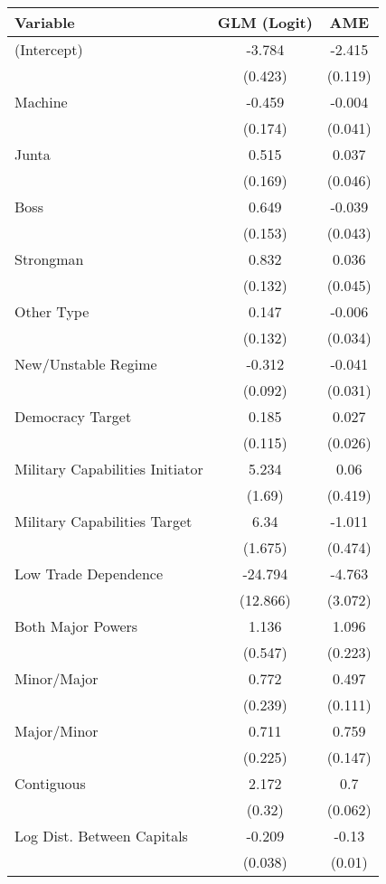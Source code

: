 \begin{table}[ht]
\centering
\begingroup\normalsize
\begin{tabular}{lcc}
 Variable & GLM (Logit) & AME \\ 
  \hline
\hline
(Intercept) & -3.784 & -2.415 \\ 
   & (0.423) & (0.119) \\ 
  Machine & -0.459 & -0.004 \\ 
   & (0.174) & (0.041) \\ 
  Junta & 0.515 & 0.037 \\ 
   & (0.169) & (0.046) \\ 
  Boss & 0.649 & -0.039 \\ 
   & (0.153) & (0.043) \\ 
  Strongman & 0.832 & 0.036 \\ 
   & (0.132) & (0.045) \\ 
  Other Type & 0.147 & -0.006 \\ 
   & (0.132) & (0.034) \\ 
  New/Unstable Regime & -0.312 & -0.041 \\ 
   & (0.092) & (0.031) \\ 
  Democracy Target & 0.185 & 0.027 \\ 
   & (0.115) & (0.026) \\ 
  Military Capabilities Initiator & 5.234 & 0.06 \\ 
   & (1.69) & (0.419) \\ 
  Military Capabilities Target  & 6.34 & -1.011 \\ 
   & (1.675) & (0.474) \\ 
  Low Trade Dependence  & -24.794 & -4.763 \\ 
   & (12.866) & (3.072) \\ 
  Both Major Powers & 1.136 & 1.096 \\ 
   & (0.547) & (0.223) \\ 
  Minor/Major & 0.772 & 0.497 \\ 
   & (0.239) & (0.111) \\ 
  Major/Minor & 0.711 & 0.759 \\ 
   & (0.225) & (0.147) \\ 
  Contiguous & 2.172 & 0.7 \\ 
   & (0.32) & (0.062) \\ 
  Log Dist. Between Capitals & -0.209 & -0.13 \\ 
   & (0.038) & (0.01) \\ 

\end{tabular}
\end{table}
